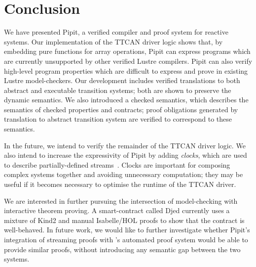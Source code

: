 
\section{Conclusion}

We have presented Pipit, a verified compiler and proof system for reactive systems.
Our implementation of the TTCAN driver logic shows that, by embedding pure \fstar{} functions for array operations, Pipit can express programs which are currently unsupported by other verified Lustre compilers.
Pipit can also verify high-level program properties which are difficult to express and prove in existing Lustre model-checkers.
Our development includes verified translations to both abstract and executable transition systems; both are shown to preserve the dynamic semantics.
We also introduced a checked semantics, which describes the semantics of checked properties and contracts; proof obligations generated by translation to abstract transition system are verified to correspond to these semantics.

In the future, we intend to verify the remainder of the TTCAN driver logic.
We also intend to increase the expressivity of Pipit by adding \emph{clocks}, which are used to describe partially-defined streams~\cite{caspi1995functional}.
Clocks are important for composing complex systems together and avoiding unnecessary computation; they may be useful if it becomes necessary to optimise the runtime of the TTCAN driver.

We are interested in further pursuing the intersection of model-checking with interactive theorem proving.
A smart-contract called Djed \cite{zahnentferner2023djed} currently uses a mixture of Kind2 \cite{champion2016kind2} and manual Isabelle/HOL proofs to show that the contract is well-behaved.
In future work, we would like to further investigate whether Pipit's integration of streaming proofs with \fstar{}'s automated proof system would be able to provide similar proofs, without introducing any semantic gap between the two systems.
